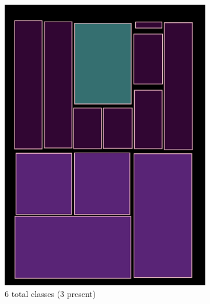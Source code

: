 \documentclass[oneside, english, bibtex]{kththesis}
\begin{document}
\begin{figure}[H]
\begin{adjustbox}{center}
\parbox{1\textwidth}{\lineskip=0pt
\begin{subfigure}{0.5\textwidth}
  \centering
  \includegraphics[width=\linewidth, clip=true, trim = 0mm 0mm 0mm 0mm]{figures/bbox/kvtooQ3.jpg}
  \caption{6 total classes (3 present)}
  \label{fig:1RoKim0_orig}
\end{subfigure}%
\begin{subfigure}{0.5\textwidth}
  \centering

\end{subfigure}}
\end{adjustbox}
\end{figure}
\end{document}
